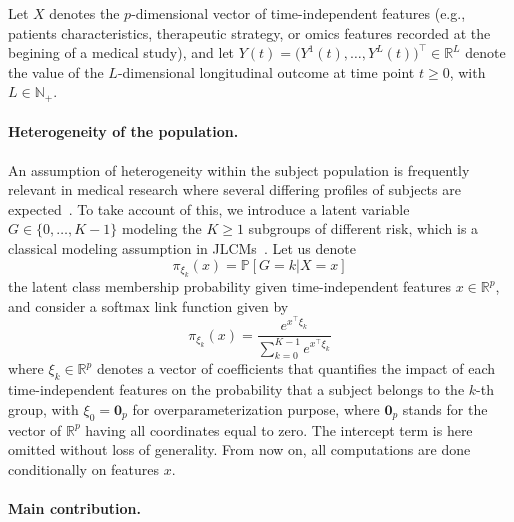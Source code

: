 \documentclass[11pt]{article}
\newcommand{\R}{\mathds R}
\newcommand{\N}{\mathds N}
\renewcommand{\P}{\mathds P}
\begin{document}
Let $X$ denotes the $p$-dimensional vector of time-independent features (e.g., patients characteristics, therapeutic strategy, or omics features recorded at the begining of a medical study), and let  $Y(t) = \big(Y^1(t), \ldots, Y^L(t) \big)^\top \in \R^L$ denote the value of the $L$-dimensional longitudinal outcome at time point $t \geq 0$, with $L \in \N_+$.


\paragraph{Heterogeneity of the population.}

An assumption of heterogeneity within the subject population is frequently relevant in medical research where several differing profiles of subjects are expected~\citep{bussy2019c}. To take account of this, we introduce a latent variable $G \in \{0, \ldots, K-1\}$ modeling the $K \geq 1$ subgroups of different risk, which is a classical modeling assumption in JLCMs~\citep{lin2002latent, proust2014joint}. Let us denote
\begin{equation}
  \label{eq:pi}
  \pi_{\xi_k}(x) = \P[G=k|X=x]
\end{equation}
the latent class membership probability given time-independent features $x \in \R^p$, and consider a softmax link function given by
\begin{equation}
  \label{eq:pi-softmax} 
  \pi_{\xi_k}(x) = \dfrac{e^{x^\top\xi_k}}{\sum_{k=0}^{K-1}e^{x^\top\xi_k}}
\end{equation}
where $\xi_k \in \R^p$ denotes a vector of coefficients that quantifies the impact of each time-independent features on the probability that a subject belongs to the $k$-th group, with $\xi_0 = \mathbf{0}_p$ for overparameterization purpose, where $\mathbf{0}_p$ stands for the vector of $\R^p$ having all coordinates equal to zero. The intercept term is here omitted without loss of generality. 
From now on, all computations are done conditionally on features $x$.

\paragraph{Main contribution.} 
\end{document}
